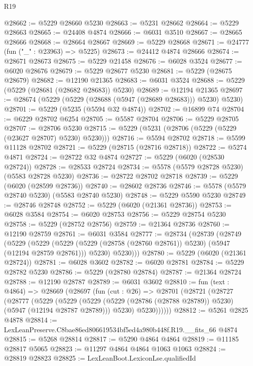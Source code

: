 \begin{lexlean}{R19}
\begin{coremodule}
@28662 := @5229 @28660 @5230
@28663 := @5231 @28662
@28664 := @5229 @28663
@28665 := @24408 @4874
@28666 := @6031 @3510
@28667 := @28665 @28666
@28668 := @28664 @28667
@28669 := @5229 @28668
@28671 := @24777 (fun ("_" : @23963) => @5225)
@28673 := @24412 @4874 @28666
@28674 := @28671 @28673
@28675 := @5229 @21458
@28676 := @6028 @3524
@28677 := @6020 @28676
@28679 := @5229 @28677 @5230
@28681 := @5229 (@28675 @28679)
@28682 := @12190 @21365
@28683 := @6031 @3524
@28688 := @5229 (@5229 (@28681 (@28682 @28683)) @5230)
@28689 := @12194 @21365
@28697 := @28674 (@5229 (@5229 (@28688 (@5947 (@28689 @28683))) @5230) @5230)
@28701 := @5229 (@5235 (@5594 @32 @4874))
@28702 := @16899 @74
@28704 := @6229 @28702 @6254
@28705 := @5587 @28704
@28706 := @5229 @28705
@28707 := @28706 @5230
@28715 := @5229 (@5231 (@28706 (@5229 (@5229 (@23627 @28707) @5230) @5230)))
@28716 := @5594 @28702
@28718 := @5599 @11128 @28702
@28721 := @5229 (@28715 (@28716 @28718))
@28722 := @5274 @4871
@28724 := @28722 @32 @4874
@28727 := @5229 (@6020 (@28530 @28724))
@28728 := @28533 @28724
@28734 := @5578 (@5579 @28728 @5230) (@5583 @28728 @5230)
@28736 := @28722 @28702 @28718
@28739 := @5229 (@6020 (@28599 @28736))
@28740 := @28602 @28736
@28746 := @5578 (@5579 @28740 @5230) (@5583 @28740 @5230)
@28748 := @5229 @5590 @5230
@28749 := @28746 @28748
@28752 := @5229 (@6020 (@21361 @28736))
@28753 := @6028 @3584
@28754 := @6020 @28753
@28756 := @5229 @28754 @5230
@28758 := @5229 (@28752 @28756)
@28759 := @21364 @28736
@28760 := @12190 @28759
@28761 := @6031 @3584
@28777 := @28734
    (@28739
      (@28749
        (@5229
          (@5229
            (@5229 (@5229 (@28758 (@28760 @28761)) @5230) (@5947 (@12194 @28759 @28761)))
            @5230)
          @5230)))
@28780 := @5229 (@6020 (@21361 @28724))
@28781 := @6028 @3602
@28782 := @6020 @28781
@28784 := @5229 @28782 @5230
@28786 := @5229 (@28780 @28784)
@28787 := @21364 @28724
@28788 := @12190 @28787
@28789 := @6031 @3602
@28810 := fun (text : @4864) =>
  @28669
    (@28697
      (fun (cut : @26) =>
      @28701
        (@28721
          (@28727
            (@28777
              (@5229
                (@5229
                  (@5229 (@5229 (@28786 (@28788 @28789)) @5230) (@5947 (@12194 @28787 @28789)))
                  @5230)
                @5230))))))
@28812 := @5261 @2825 @4878
@28814 := LexLeanPreserve.C8bae86ed806619534bf5ed4a980b448f.R19.__fits_66 @4874
@28815 := @5268 @28814
@28817 := @5290 @4864 @4864
@28819 := @11185 @28817 @5065
@28823 := @11297 @4864 @4864 @1063 @1063
@28824 := @28819 @28823
@28825 := LexLeanBoot.LexiconLse.qualifiedId

\end{coremodule}
\end{lexlean}
